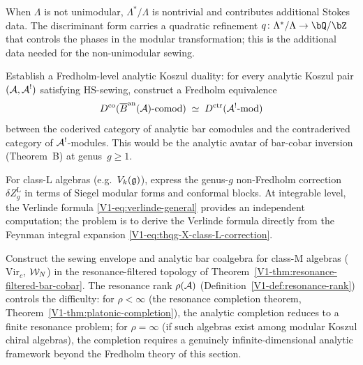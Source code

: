 \begin{remark}%
When $\Lambda$ is not unimodular, $\Lambda^*/\Lambda$ is
nontrivial and contributes additional Stokes data. The
discriminant form carries a quadratic refinement
$q \colon \Lambda^*/\Lambda \to \bQ/\bZ$ that controls the
phases in the modular transformation; this is the additional
data needed for the non-unimodular sewing.
\end{remark}

\begin{openproblem}%
%
Establish a Fredholm-level analytic Koszul duality:
for every analytic Koszul pair $(\mathcal{A}, \mathcal{A}^!)$ satisfying
HS-sewing, construct a Fredholm equivalence
\begin{equation}%
\codercat(\anbar(\cA)\text{-comod})
\;\simeq\;
\contrcat(\cA^!\text{-mod})
\end{equation}
between the coderived category of analytic bar comodules and
the contraderived category of $\mathcal{A}^!$-modules.
This would be the analytic avatar of bar-cobar inversion
(Theorem~B) at genus~$g \geq 1$.
\end{openproblem}

\begin{openproblem}%
%
For class-L algebras (e.g.\ $V_k(\mathfrak{g})$), express the
genus-$g$ non-Fredholm correction $\delta Z_g^{\mathrm{L}}$
in terms of Siegel modular forms and conformal blocks.
At integrable level, the Verlinde formula
\eqref{V1-eq:verlinde-general} provides an independent
computation; the problem is to derive the Verlinde formula
directly from the Feynman integral expansion
\eqref{V1-eq:thqg-X-class-L-correction}.
\end{openproblem}

\begin{openproblem}%
%
Construct the sewing envelope and analytic bar coalgebra for
class-M algebras ($\mathrm{Vir}_c$, $\mathcal{W}_N$) in the
resonance-filtered topology of
Theorem~\ref{V1-thm:resonance-filtered-bar-cobar}.
The resonance rank $\rho(\mathcal{A})$
(Definition~\ref{V1-def:resonance-rank}) controls the
difficulty: for $\rho < \infty$ (the resonance completion
theorem, Theorem~\ref{V1-thm:platonic-completion}), the
analytic completion reduces to a finite resonance problem;
for $\rho = \infty$ (if such algebras exist among modular
Koszul chiral algebras), the completion requires a genuinely
infinite-dimensional analytic framework beyond the Fredholm
theory of this section.
\end{openproblem}

